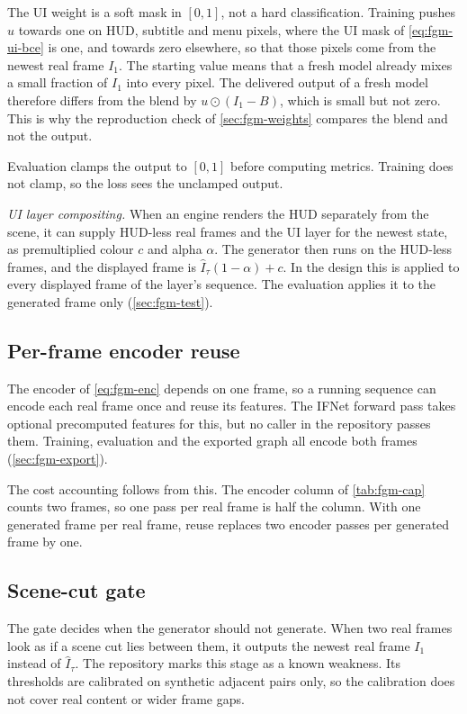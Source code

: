 The UI weight is a soft mask in $[0,1]$, not a hard classification. Training pushes $u$ towards one on HUD, subtitle and menu pixels, where the UI mask of \cref{eq:fgm-ui-bce} is one, and towards zero elsewhere, so that those pixels come from the newest real frame $I_1$. The starting value means that a fresh model already mixes a small fraction of $I_1$ into every pixel. The delivered output of a fresh model therefore differs from the blend by $u\odot(I_1-B)$, which is small but not zero. This is why the reproduction check of \cref{sec:fgm-weights} compares the blend and not the output.

Evaluation clamps the output to $[0,1]$ before computing metrics. Training does not clamp, so the loss sees the unclamped output.

\emph{UI layer compositing.} When an engine renders the HUD separately from the scene, it can supply HUD-less real frames and the UI layer for the newest state, as premultiplied colour $c$ and alpha $\alpha$. The generator then runs on the HUD-less frames, and the displayed frame is $\hat I_\tau(1-\alpha)+c$. In the design this is applied to every displayed frame of the layer's sequence. The evaluation applies it to the generated frame only (\cref{sec:fgm-test}).

\subsection{Per-frame encoder reuse}\label{sec:fgm-encoder}

The encoder of \cref{eq:fgm-enc} depends on one frame, so a running sequence can encode each real frame once and reuse its features. The IFNet forward pass takes optional precomputed features for this, but no caller in the repository passes them. Training, evaluation and the exported graph all encode both frames (\cref{sec:fgm-export}).

The cost accounting follows from this. The encoder column of \cref{tab:fgm-cap} counts two frames, so one pass per real frame is half the column. With one generated frame per real frame, reuse replaces two encoder passes per generated frame by one.

\subsection{Scene-cut gate}\label{sec:fgm-cut}

\UnderRevision{} The gate decides when the generator should not generate. When two real frames look as if a scene cut lies between them, it outputs the newest real frame $I_1$ instead of $\hat I_\tau$. The repository marks this stage as a known weakness. Its thresholds are calibrated on synthetic adjacent pairs only, so the calibration does not cover real content or wider frame gaps.

